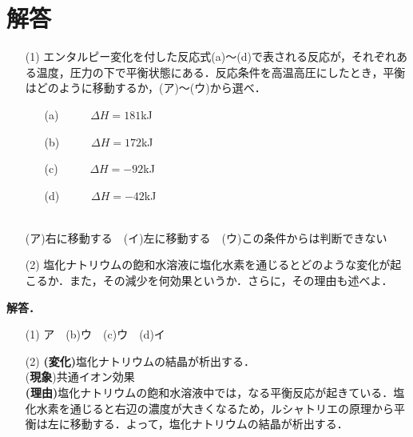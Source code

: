 \documentclass[a4paper,11pt]{ltjsarticle}
\begin{document}
\section*{解答}
\begin{que}%
\begin{itemize}
    \item [(1)]エンタルピー変化を付した反応式(a)〜(d)で表される反応が，それぞれある温度，圧力の下で平衡状態にある．反応条件を高温高圧にしたとき，平衡はどのように移動するか，(ア)〜(ウ)から選べ．
    \begin{itemize}
        \item [(a)]~~~~~$\varDelta H=181$kJ
        \item [(b)]~~~~~$\varDelta H=172$kJ
        \item [(c)]~~~~~$\varDelta H=-92$kJ
        \item [(d)]~~~~~$\varDelta H=-42$kJ
    \end{itemize}
    　\\
    (ア)右に移動する　(イ)左に移動する　(ウ)この条件からは判断できない
    \item [(2)]塩化ナトリウムの飽和水溶液に塩化水素を通じるとどのような変化が起こるか．また，その減少を何効果というか．さらに，その理由も述べよ．
\end{itemize}
\end{que}
\noindent\textbf{解答．}
\begin{itemize}
    \item [(1)]ア　(b)ウ　(c)ウ　(d)イ
    \item [(2)]\textbf{(変化)}塩化ナトリウムの結晶が析出する．\\
    (\textbf{現象})共通イオン効果\\
    \textbf{(理由)}塩化ナトリウムの飽和水溶液中では，なる平衡反応が起きている．塩化水素を通じると右辺の濃度が大きくなるため，ルシャトリエの原理から平衡は左に移動する．よって，塩化ナトリウムの結晶が析出する．
\end{itemize}
\newpage
\end{document}
